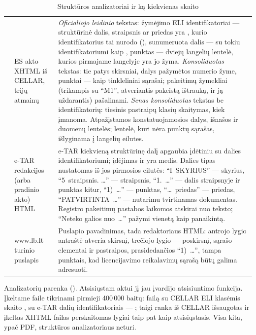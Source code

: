 \begin{table}[H]
\caption{Struktūros analizatoriai ir ką kiekvienas skaito}\label{tab:corpus:parsers}
\begin{tabularx}{\textwidth}{@{}L{20mm}L{35mm}Y@{}}
\toprule
{} &  &  \\
\midrule
{} & ES akto XHTML iš CELLAR, trijų atmainų & \emph{Oficialiojo leidinio} tekstas: žymėjimo ELI identifikatoriai --- struktūrinė dalis, straipsnis ar priedas yra , kurio identifikatorius tai nurodo (), sunumeruota dalis ---  su tokiu identifikatoriumi kaip , punktas --- dviejų langelių lentelė, kurios pirmajame langelyje yra jo žyma. \emph{Konsoliduotas} tekstas: tie patys skirsniai, dalys pažymėtos numerio žyme, punktai --- kaip tinkleliniai sąrašai; pakeitimų žymekliai (trikampis su \enquote{M1}, atveriantis pakeistą ištrauką, ir ją uždarantis) pašalinami. \emph{Senas konsoliduotas} tekstas be identifikatorių: tiesinis pastraipų klasių skaitymas, kiek įmanoma. Atpažįstamos konstatuojamosios dalys, išnašos ir duomenų lentelės; lentelė, kuri nėra punktų sąrašas, išlyginama į langelių eilutes. \\
 & e-TAR redakcijos (arba pradinio akto) HTML & e-TAR kiekvieną struktūrinę dalį apgaubia įdėtiniu  su dalies identifikatoriumi; įdėjimas ir yra medis. Dalies tipas nustatomas iš jos pirmosios eilutės: \enquote{I~SKYRIUS} --- skyrius, \enquote{5~straipsnis. …} --- straipsnis, \enquote{1.~…} --- dalis straipsnyje ir punktas kitur, \enquote{1)~…} --- punktas, \enquote{…~priedas} --- priedas, \enquote{PATVIRTINTA~…} --- nutarimu tvirtinamas dokumentas. Registro pakeitimų pastabos laikomos atskirai nuo teksto; \enquote{Neteko galios nuo~…} pažymi vienetą kaip panaikintą. \\
 & www.lb.lt turinio puslapis & Puslapio pavadinimas, tada redaktoriaus HTML: antrojo lygio antraštė atveria skirsnį, trečiojo lygio --- poskirsnį, sąrašo elementai ir pastraipos, prasidedančios \enquote{1)~…}, tampa punktais, kad licencijavimo reikalavimų sąrašą būtų galima adresuoti. \\
\bottomrule
\end{tabularx}
\end{table}

Analizatorių parenka  (). Atsisiųstam aktui
jį jau įvardijo atsisiuntimo funkcija. Įkeltame faile tikrinami pirmieji 400\,000 baitų: failą
su CELLAR ELI klasėmis skaito , su e-TAR dalių identifikatoriais ---
; taigi ranka iš CELLAR išsaugotas ir įkeltas XHTML failas perskaitomas lygiai
taip pat kaip atsisiųstasis. Visa kita, ypač PDF, struktūros analizatoriaus neturi.

